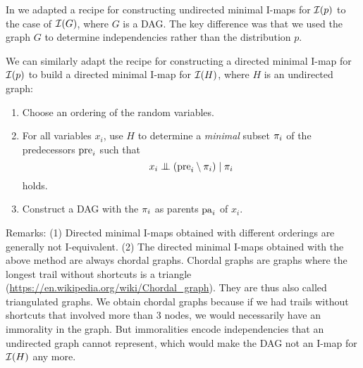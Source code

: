 In  we adapted a recipe for constructing
undirected minimal I-maps for $\mathcal{I}(p)$ to the case of $\mathcal{I}(G)$,
where $G$ is a DAG. The key difference was that we used the graph $G$
to determine independencies rather than the distribution $p$.

We can similarly adapt the recipe for constructing a directed minimal
I-map for $\mathcal{I}(p)$ to build a directed minimal I-map for $\mathcal{I}(H)$,
where $H$ is an undirected graph:
\begin{enumerate}
  \item Choose an ordering of the random variables.
  \item For all variables $x_i$, use $H$ to determine a \emph{minimal}
    subset $\pi_i$ of the predecessors $\mathrm{pre}_i$ such that
    $$ x_i \mathrel{\perp\mspace{-10mu}\perp} \left(\mathrm{pre}_i \setminus \pi_i\right) \mid \pi_i $$
    holds.
  \item Construct a DAG with the $\pi_i$ as parents $\mathrm{pa}_i$ of $x_i$.
\end{enumerate}
Remarks: (1) Directed minimal I-maps obtained with different orderings
are generally not I-equivalent. (2) The directed minimal I-maps
obtained with the above method are always chordal graphs. Chordal
graphs are graphs where the longest trail without shortcuts is a
triangle (\url{https://en.wikipedia.org/wiki/Chordal_graph}). They are
thus also called triangulated graphs. We obtain chordal graphs because
if we had trails without shortcuts that involved more than 3 nodes, we would
necessarily have an immorality in the graph. But immoralities encode
independencies that an undirected graph cannot represent, which would
make the DAG not an I-map for $\mathcal{I}(H)$ any more.

